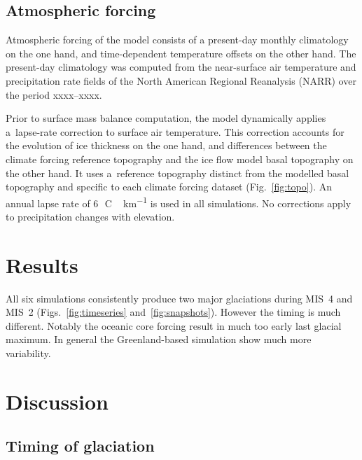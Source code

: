 \documentclass[tc, ms]{copernicus}
\begin{document}
\subsection{Atmospheric forcing}

Atmospheric forcing of the model consists of a present-day monthly climatology
on the one hand, and time-dependent temperature offsets on the other hand. The
present-day climatology was computed from the near-surface air temperature and
precipitation rate fields of the North American Regional Reanalysis (NARR) over
the period xxxx--xxxx.

Prior to surface mass balance computation, the model dynamically applies
a~lapse-rate correction to surface air temperature. This correction accounts
for the evolution of ice thickness on the one hand, and differences between the
climate forcing reference topography and the ice flow model basal topography on
the other hand. It uses a~reference topography distinct from the modelled basal
topography and specific to each climate forcing dataset (Fig.~\ref{fig:topo}).
An annual lapse rate of 6\,\unit{{\degree}C\,km^{-1}} is used in all
simulations. No corrections apply to precipitation changes with elevation.


\section{Results}
\label{sec:results}

All six simulations consistently produce two major glaciations during MIS~4 and
MIS~2 (Figs.~\ref{fig:timeseries} and~\ref{fig:snapshots}). However the timing
is much different. Notably the oceanic core forcing result in much too early
last glacial maximum. In general the Greenland-based simulation show much more
variability.

\section{Discussion}
\label{sec:discussion}

\subsection{Timing of glaciation}
\end{document}
